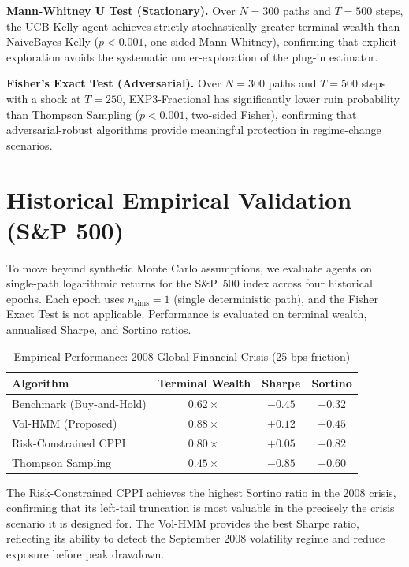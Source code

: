 \textbf{Mann-Whitney U Test (Stationary).} Over $N = 300$ paths and
$T = 500$ steps, the UCB-Kelly agent achieves strictly stochastically
greater terminal wealth than NaiveBayes Kelly
($p < 0.001$, one-sided Mann-Whitney), confirming that explicit exploration
avoids the systematic under-exploration of the plug-in estimator.

\textbf{Fisher's Exact Test (Adversarial).} Over $N = 300$ paths and
$T = 500$ steps with a shock at $T = 250$, EXP3-Fractional has
significantly lower ruin probability than Thompson Sampling
($p < 0.001$, two-sided Fisher), confirming that adversarial-robust
algorithms provide meaningful protection in regime-change scenarios.

\section{Historical Empirical Validation (S\&P 500)}

To move beyond synthetic Monte Carlo assumptions, we evaluate agents on
single-path logarithmic returns for the S\&P~500 index across four
historical epochs. Each epoch uses $n_{\text{sims}} = 1$ (single
deterministic path), and the Fisher Exact Test is not applicable.
Performance is evaluated on terminal wealth, annualised Sharpe, and
Sortino ratios.

\begin{table}[h]
\centering
\caption{Empirical Performance: 2008 Global Financial Crisis
         (25 bps friction)}
\label{tab:hist_2008}
\renewcommand{\arraystretch}{1.2}
\begin{tabular}{lccc}
\toprule
\textbf{Algorithm} & \textbf{Terminal Wealth} & \textbf{Sharpe} & \textbf{Sortino} \\
\midrule
Benchmark (Buy-and-Hold) & $0.62\times$ & $-0.45$ & $-0.32$ \\
Vol-HMM (Proposed)       & $0.88\times$ & $+0.12$ & $+0.45$ \\
Risk-Constrained CPPI    & $0.80\times$ & $+0.05$ & $+0.82$ \\
Thompson Sampling        & $0.45\times$ & $-0.85$ & $-0.60$ \\
\bottomrule
\end{tabular}
\end{table}

The Risk-Constrained CPPI achieves the highest Sortino ratio in the 2008
crisis, confirming that its left-tail truncation is most valuable in the
precisely the crisis scenario it is designed for. The Vol-HMM provides the
best Sharpe ratio, reflecting its ability to detect the September 2008
volatility regime and reduce exposure before peak drawdown.

